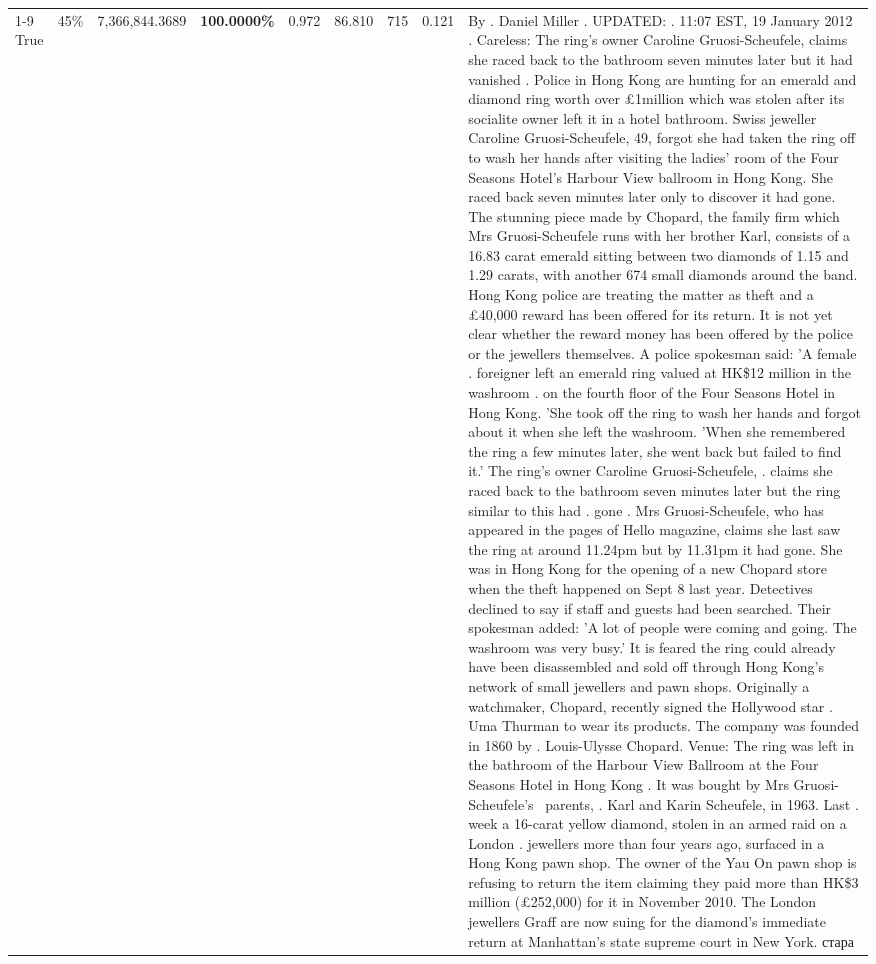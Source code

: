 \begin{table}[H]
\begin{tabular}{lllrlllll}
\cline{1-9} \cline{2-9}
True & 45\% & 7,366,844.3689 & \bfseries \color{red} 100.0000\% & 0.972 & 86.810 & 715 & 0.121 & By . Daniel Miller . UPDATED: . 11:07 EST, 19 January 2012 . Careless: The ring's owner Caroline Gruosi-Scheufele, claims she raced back to the bathroom seven minutes later but it had vanished . Police in Hong Kong are hunting for an emerald and diamond ring worth over £1million which was stolen after its socialite owner left it in a hotel bathroom. Swiss jeweller Caroline Gruosi-Scheufele, 49, forgot she had taken the ring off to wash her hands after visiting the ladies' room of the Four Seasons Hotel's Harbour View ballroom in Hong Kong. She raced back seven minutes later only to discover it had gone. The stunning piece made by Chopard, the family firm which Mrs Gruosi-Scheufele runs with her brother Karl, consists of a 16.83 carat emerald sitting between two diamonds of 1.15 and 1.29 carats, with another 674 small diamonds around the band. Hong Kong police are treating the matter as theft and a £40,000 reward has been offered for its return. It is not yet clear whether the reward money has been offered by the police or the jewellers themselves. A police spokesman said: 'A female . foreigner left an emerald ring valued at HK\$12 million in the washroom . on the fourth floor of the Four Seasons Hotel in Hong Kong. 'She took off the ring to wash her hands and forgot about it when she left the washroom. 'When she remembered the ring a few minutes later, she went back but failed to find it.' The ring's owner Caroline Gruosi-Scheufele, . claims she raced back to the bathroom seven minutes later but the ring similar to this had . gone . Mrs Gruosi-Scheufele, who has appeared in the pages of Hello magazine, claims she last saw the ring at around 11.24pm but by 11.31pm it had gone. She was in Hong Kong for the opening of a new Chopard store when the theft happened on Sept 8 last year. Detectives declined to say if staff and guests had been searched. Their spokesman added: 'A lot of people were coming and going. The washroom was very busy.' It is feared the ring could already have been disassembled and sold off through Hong Kong's network of small jewellers and pawn shops. Originally a watchmaker, Chopard, recently signed the Hollywood star . Uma Thurman to wear its products. The company was founded in 1860 by . Louis-Ulysse Chopard. Venue: The ring was left in the bathroom of the Harbour View Ballroom at the Four Seasons Hotel in Hong Kong . It was bought by Mrs Gruosi-Scheufele's  parents, . Karl and Karin Scheufele, in 1963. Last . week a 16-carat yellow diamond, stolen in an armed raid on a London . jewellers more than four years ago, surfaced in a Hong Kong pawn shop. The owner of the Yau On pawn shop is refusing to return the item claiming they paid more than HK\$3 million (£252,000) for it in November 2010. The London jewellers Graff are now suing for the diamond’s immediate return at Manhattan’s state supreme court in New York. стара \\

\end{tabular}
\end{table}
